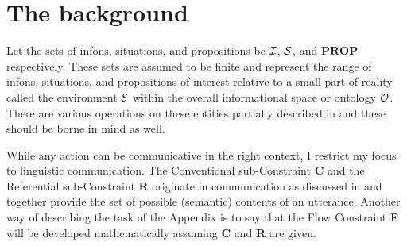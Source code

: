 %
%



\section{The background}\label{sec:A.1}

Let the sets of infons, situations, and propositions be $\cal I$, $\cal S$, and $\mathbf{PROP}$ respectively. These sets are assumed to be finite and represent the range of infons, situations, and propositions of interest relative to a small part of reality called the environment $\cal E$ within the overall informational space or ontology $\cal O$. There are various operations on these entities partially described in  and these should be borne in mind as well.


While any action can be communicative in the right context, I restrict my focus to linguistic communication. The Conventional sub-Constraint \textbf{C} and the Referential sub-Constraint \textbf{R} originate in communication as discussed in  and together provide the set of possible (semantic) contents of an utterance. Another way of describing the task of the Appendix is to say that the Flow Constraint \textbf{F} will be developed mathematically assuming \textbf{C} and \textbf{R} are given.


